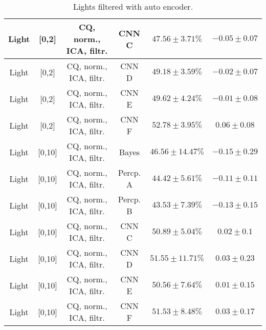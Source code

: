 \begin{table}[!htb]
{\begin{tabular}{c|c|c|c|c|c}
    \hline
    Light               & [0,2]                                & \scriptsize{CQ, norm., ICA, filtr.}       & CNN C                 &  $47.56 \pm 3.71\%$   & $-0.05 \pm 0.07$\\  
    \hline
    Light               & [0,2]                                & \scriptsize{CQ, norm., ICA, filtr.}       & CNN D                 &  $49.18 \pm 3.59\%$   & $-0.02 \pm 0.07$\\  
    \hline
    Light               & [0,2]                                & \scriptsize{CQ, norm., ICA, filtr.}       & CNN E                 &  $49.62 \pm 4.24\%$   & $-0.01 \pm 0.08$\\  
    \hline
    Light               & [0,2]                                & \scriptsize{CQ, norm., ICA, filtr.}       & CNN F                 &  $52.78 \pm 3.95\%$   & $0.06 \pm 0.08$\\   
    \hline
    Light               & [0,10]                               & \scriptsize{CQ, norm., ICA, filtr.}       & Bayes                 &  $46.56 \pm 14.47\%$  & $-0.15 \pm 0.29$\\  
    \hline
    Light               & [0,10]                               & \scriptsize{CQ, norm., ICA, filtr.}       & Percp. A              &  $44.42 \pm 5.61\%$   & $-0.11 \pm 0.11$\\  
    \hline
    Light               & [0,10]                               & \scriptsize{CQ, norm., ICA, filtr.}       & Percp. B              &  $43.53 \pm 7.39\%$   & $-0.13 \pm 0.15$\\  
    \hline
    Light               & [0,10]                               & \scriptsize{CQ, norm., ICA, filtr.}       & CNN C                 &  $50.89 \pm 5.04\%$   & $0.02 \pm 0.1$\\   
    \hline
    Light               & [0,10]                               & \scriptsize{CQ, norm., ICA, filtr.}       & CNN D                 &  $51.55 \pm 11.71\%$  & $0.03 \pm 0.23$\\  
    \hline
    Light               & [0,10]                               & \scriptsize{CQ, norm., ICA, filtr.}       & CNN E                 &  $50.56 \pm 7.64\%$   & $0.01 \pm 0.15$\\  
    \hline
    Light               & [0,10]                               & \scriptsize{CQ, norm., ICA, filtr.}       & CNN F                 &  $51.53 \pm 8.48\%$   & $0.03 \pm 0.17$\\   
    \hline
\end{tabular}
}
\caption{Lights filtered with auto encoder.}
\label{tab:lights-filtered-app}
\end{table}